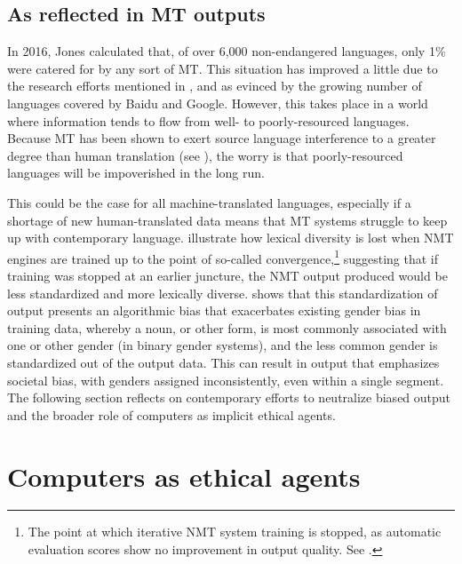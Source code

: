 \documentclass[output=paper]{langscibook}
\begin{document}
\subsection{As reflected in MT outputs}\label{sec:moorkens:5.2}\largerpage

In 2016, Jones calculated that, of over 6,000 non-endangered languages, only 1\% were catered for by any sort of MT. This situation has improved a little due to the research efforts mentioned in , and as evinced by the growing number of languages covered by Baidu and Google. However, this takes place in a world where information tends to flow from well- to poorly-resourced languages. Because MT has been shown to exert source language interference to a greater degree than human translation (see \citealt{Toral2019}), the worry is that poorly-resourced languages will be impoverished in the long run.

This could be the case for all machine-translated languages, especially if a shortage of new human-translated data means that MT systems struggle to keep up with contemporary language. \citet{VanmassenhoveWay2019} illustrate how lexical diversity is lost when NMT engines are trained up to the point of so-called convergence,\footnote{The point at which iterative NMT system training is stopped, as automatic evaluation scores show no improvement in output quality. See .} suggesting that if training was stopped at an earlier juncture, the NMT output produced would be less standardized and more lexically diverse. \citet{Vanmassenhove2019} shows that this standardization of output presents an algorithmic bias that exacerbates existing gender bias in training data, whereby a noun, or other form, is most commonly associated with one or other gender (in binary gender systems), and the less common gender is standardized out of the output data. This can result in output that emphasizes societal bias, with genders assigned inconsistently, even within a single segment. The following section reflects on contemporary efforts to neutralize biased output and the broader role of computers as implicit ethical agents.

\section{Computers as ethical agents}\label{sec:moorkens:6}
\end{document}
